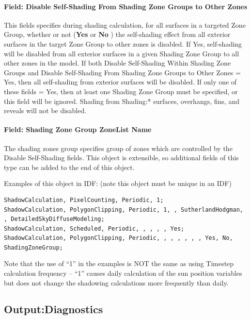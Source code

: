 \paragraph{Field: Disable Self-Shading From Shading Zone Groups to Other Zones}\label{field-self-disable-shading-between-zone-groups}
This fields specifies during shading calculation, for all surfaces in a targeted Zone Group, whether or not (\textbf{Yes} or \textbf{No} ) the self-shading effect from all exterior surfaces in the target Zone Group to other zones is disabled. If Yes, self-shading will be disabled from all exterior surfaces in a given Shading Zone Group to all other zones in the model. If both Disable Self-Shading Within Shading Zone Groups and Disable Self-Shading From Shading Zone Groups to Other Zones = Yes, then all self-shading from exterior surfaces will be disabled. If only one of these fields = Yes, then at least one Shading Zone Group must be specified, or this field will be ignored. Shading from Shading:* surfaces, overhangs, fins, and reveals will not be disabled.

\paragraph{Field: Shading Zone Group ZoneList Name}\label{field-shading-zone-group-zoneList-name}
The shading zones group specifies group of zones which are controlled by the Disable Self-Shading fields. This object is extensible, so additional fields of this type can be added to the end of this object.

Examples of this object in IDF: (note this object must be unique in an IDF)

\begin{lstlisting}
ShadowCalculation, PixelCounting, Periodic, 1;
ShadowCalculation, PolygonClipping, Periodic, 1, , SutherlandHodgman, , DetailedSkyDiffuseModeling;
ShadowCalculation, Scheduled, Periodic, , , , , Yes;
ShadowCalculation, PolygonClipping, Periodic, , , , , , , Yes, No, ShadingZoneGroup;
\end{lstlisting}

Note that the use of ``1'' in the examples is NOT the same as using Timestep calculation frequency -- ``1'' causes daily calculation of the sun position variables but does not change the shadowing calculations more frequently than daily.

\subsection{Output:Diagnostics}\label{outputdiagnostics}

